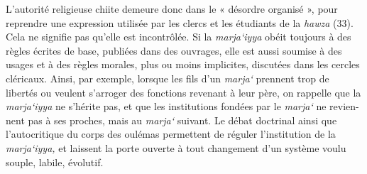 L'autorité religieuse chiite demeure donc dans le « désordre organisé »,
pour reprendre une expression utilisée par les clercs et les étudiants
de la \emph{hawza} (33). Cela ne signifie pas qu'elle est incontrôlée.
Si la \emph{marja`iyya} obéit toujours à des règles écrites de base,
publiées dans des ouvrages, elle est aussi soumise à des usages et à des
règles morales, plus ou moins implicites, discutées dans les cercles
cléricaux. Ainsi, par exemple, lorsque les fils d'un \emph{marja`}
prennent trop de libertés ou veulent s'arroger des fonctions revenant à
leur père, on rappelle que la \emph{marja`iyya} ne s'hérite pas, et que
les institutions fondées par le \emph{marja`} ne revien- nent pas à ses
proches, mais au \emph{marja`} suivant. Le débat doctrinal ainsi que
l'autocritique du corps des oulémas permettent de réguler l'institution
de la \emph{marja`iyya,} et laissent la porte ouverte à tout changement
d'un système voulu souple, labile, évolutif.